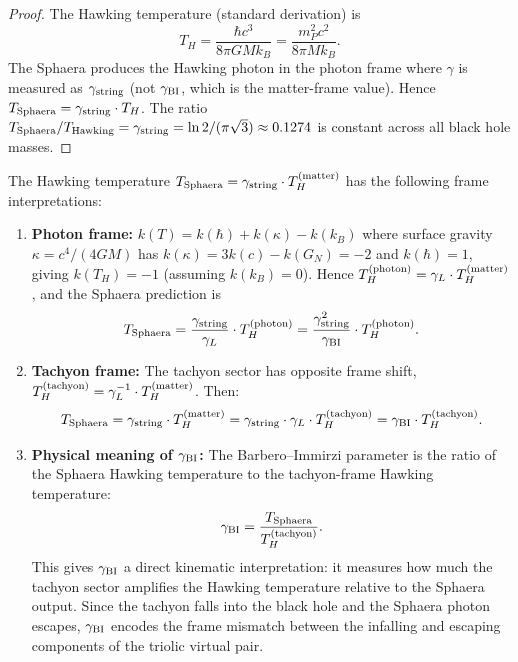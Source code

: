 \begin{proof}
The Hawking temperature (standard derivation) is
\[
T_H = \frac{\hbar c^3}{8\pi G M k_B} = \frac{m_P^2 c^2}{8\pi M k_B}.
\]
The Sphaera produces the Hawking photon in the photon frame where
$\gamma$ is measured as $\gamma_{\mathrm{string}}$ (not $\gamma_{\mathrm{BI}}$, which is the
matter-frame value).
Hence $T_{\mathrm{Sphaera}} = \gamma_{\mathrm{string}}\cdot T_H$.
The ratio $T_{\mathrm{Sphaera}}/T_{\mathrm{Hawking}}=\gamma_{\mathrm{string}}
=\ln 2/(\pi\sqrt{3})\approx 0.1274$ is constant across all black hole
masses.
\end{proof}

\begin{proposition}
\label{prop:hawking-gBI-tachyon}
The Hawking temperature $T_{\mathrm{Sphaera}} = \gamma_{\mathrm{string}}\cdot T_H^{(\mathrm{matter})}$
has the following frame interpretations:
\begin{enumerate}[label=(\roman*)]
  \item \textbf{Photon frame:} $k(T) = k(\hbar) + k(\kappa) - k(k_B)$
    where surface gravity $\kappa = c^4/(4GM)$ has
    $k(\kappa) = 3k(c) - k(G_N) = -2$ and $k(\hbar) = 1$,
    giving $k(T_H) = -1$ (assuming $k(k_B)=0$).
    Hence $T_H^{(\mathrm{photon})} = \gamma_L \cdot T_H^{(\mathrm{matter})}$,
    and the Sphaera prediction is
    \[
      T_{\mathrm{Sphaera}} = \frac{\gamma_{\mathrm{string}}}{\gamma_L}\cdot T_H^{(\mathrm{photon})}
      = \frac{\gamma_{\mathrm{string}}^2}{\gamma_{\mathrm{BI}}}\cdot T_H^{(\mathrm{photon})}.
    \]
  \item \textbf{Tachyon frame:} The tachyon sector has opposite frame shift,
    $T_H^{(\mathrm{tachyon})} = \gamma_L^{-1}\cdot T_H^{(\mathrm{matter})}$. Then:
    \[
      T_{\mathrm{Sphaera}}
      = \gamma_{\mathrm{string}}\cdot T_H^{(\mathrm{matter})}
      = \gamma_{\mathrm{string}}\cdot\gamma_L\cdot T_H^{(\mathrm{tachyon})}
      = \gamma_{\mathrm{BI}}\cdot T_H^{(\mathrm{tachyon})}.
    \]
  \item \textbf{Physical meaning of $\gamma_{\mathrm{BI}}$:} The Barbero--Immirzi parameter
    is the ratio of the Sphaera Hawking temperature to the tachyon-frame
    Hawking temperature:
    \[
      \gamma_{\mathrm{BI}} = \frac{T_{\mathrm{Sphaera}}}{T_H^{(\mathrm{tachyon})}}.
    \]
    This gives $\gamma_{\mathrm{BI}}$ a direct kinematic interpretation: it measures how much
    the tachyon sector amplifies the Hawking temperature relative to the
    Sphaera output. Since the tachyon falls into the black hole and the
    Sphaera photon escapes, $\gamma_{\mathrm{BI}}$ encodes the frame mismatch between the
    infalling and escaping components of the triolic virtual pair.
\end{enumerate}
\end{proposition}

